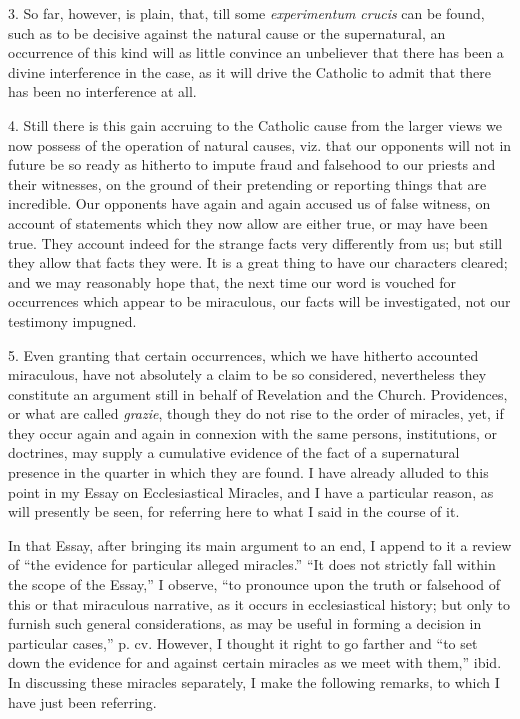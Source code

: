 3. So far, however, is plain, that, till some \emph{experimentum crucis}
can be found, such as to be decisive against the natural cause or the
supernatural, an occurrence of this kind will as little convince an
unbeliever that there has been a divine interference in the case, as it
will drive the Catholic to admit that there has been no interference at
all.

4. Still there is this gain accruing to the Catholic cause from the
larger views we now possess of the operation of natural causes, viz.
that our opponents will not in future be so ready as hitherto to impute
fraud and falsehood to our priests and their witnesses, on the ground of
their pretending or reporting things that are incredible. Our opponents
have again and again accused us of false witness, on account of
statements which they now allow are either true, or may have been true.
They account indeed for the strange facts very differently from us; but
still they allow that facts they were. It is a great thing to have our
characters cleared; and we may reasonably hope that, the next time our
word is vouched for occurrences which appear to be miraculous, our
facts will be investigated, not our testimony impugned.

5. Even granting that certain occurrences, which we have hitherto
accounted miraculous, have not absolutely a claim to be so considered,
nevertheless they constitute an argument still in behalf of Revelation
and the Church. Providences, or what are called \emph{grazie}, though
they do not rise to the order of miracles, yet, if they occur again and
again in connexion with the same persons, institutions, or doctrines,
may supply a cumulative evidence of the fact of a supernatural presence
in the quarter in which they are found. I have already alluded to this
point in my Essay on Ecclesiastical
Miracles, and I have a particular
reason, as will presently be seen, for referring here to what I said in
the course of it.

In that Essay, after bringing its main argument to an end, I append
to it a review of ``the evidence for particular alleged
miracles.'' ``It does not strictly fall within the scope of the
Essay,'' I observe, ``to pronounce upon the truth or falsehood
of this or that miraculous narrative, as it occurs in ecclesiastical
history; but only to furnish such general considerations, as may be
useful in forming a decision in particular cases,'' p. cv. However,
I thought it right to go farther and ``to set down the evidence for
and against certain miracles as we meet with them,'' ibid. In
discussing these miracles separately, I make the following remarks, to
which I have just been referring.

